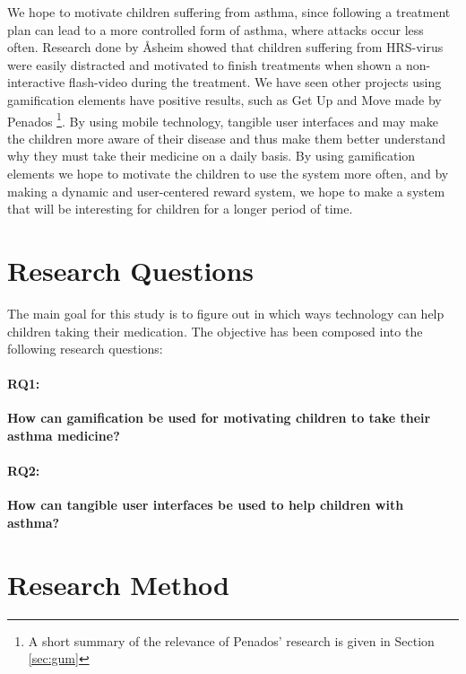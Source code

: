 We hope to motivate children suffering from asthma, since following a treatment plan can lead to a more controlled form of asthma, where attacks occur less often\cite{ginasthma}. 
Research done by \r{A}sheim showed that children suffering from HRS-virus were easily distracted and motivated to finish treatments when shown a non-interactive flash-video during the treatment\cite{Asheim610877}. We have seen other projects using gamification elements have positive results, such as Get Up and Move made by Penados \etal{}\cite{penadosget}\footnote{A short summary of the relevance of Penados' research is given in Section \ref{sec:gum}}. 
By using mobile technology, tangible user interfaces and may make the children more aware of their disease and thus make them better understand why they must take their medicine on a daily basis. 
By using gamification elements we hope to motivate the children to use the system more often, and by making a dynamic and user-centered reward system, we hope to make a system that will be interesting for children for a longer period of time.  


\section{Research Questions}
\label{sec:researchquestions}
The main goal for this study is to figure out in which ways technology can help children taking their medication. The objective has been composed into the following research questions: 

\paragraph{RQ1:}
\textbf{How can gamification be used for motivating children to take their asthma medicine?}


\paragraph{RQ2:}
\textbf{How can tangible user interfaces be used to help children with asthma?}


\section{Research Method}
\label{sec:researchmethod}


